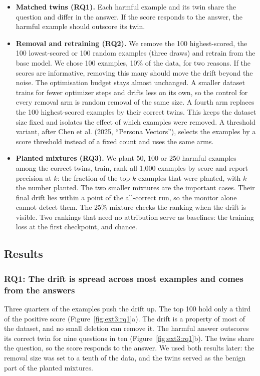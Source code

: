 \begin{itemize}
  \item \textbf{Matched twins (RQ1).} Each harmful example and its twin share the question and differ in the answer. If the score responds to the answer, the harmful example should outscore its twin.
  \item \textbf{Removal and retraining (RQ2).} We remove the 100 highest-scored, the 100 lowest-scored or 100 random examples (three draws) and retrain from the base model. We chose 100 examples, 10\% of the data, for two reasons. If the scores are informative, removing this many should move the drift beyond the noise. The optimisation budget stays almost unchanged. A smaller dataset trains for fewer optimizer steps and drifts less on its own, so the control for every removal arm is random removal of the same size. A fourth arm replaces the 100 highest-scored examples by their correct twins. This keeps the dataset size fixed and isolates the effect of which examples were removed. A threshold variant, after Chen et al. (2025, ``Persona Vectors''), selects the examples by a score threshold instead of a fixed count and uses the same arms.
  \item \textbf{Planted mixtures (RQ3).} We plant 50, 100 or 250 harmful examples among the correct twins, train, rank all 1,000 examples by score and report precision at $k$: the fraction of the top-$k$ examples that were planted, with $k$ the number planted. The two smaller mixtures are the important cases. Their final drift lies within a point of the all-correct run, so the monitor alone cannot detect them. The 25\% mixture checks the ranking when the drift is visible. Two rankings that need no attribution serve as baselines: the training loss at the first checkpoint, and chance.
\end{itemize}

\subsection{Results}

\subsubsection{RQ1: The drift is spread across most examples and comes from the answers}

Three quarters of the examples push the drift up. The top 100 hold only a third of the positive score (Figure~\ref{fig:ext3:rq1}a). The drift is a property of most of the dataset, and no small deletion can remove it. The harmful answer outscores its correct twin for nine questions in ten (Figure~\ref{fig:ext3:rq1}b). The twins share the question, so the score responds to the answer. We used both results later: the removal size was set to a tenth of the data, and the twins served as the benign part of the planted mixtures.

